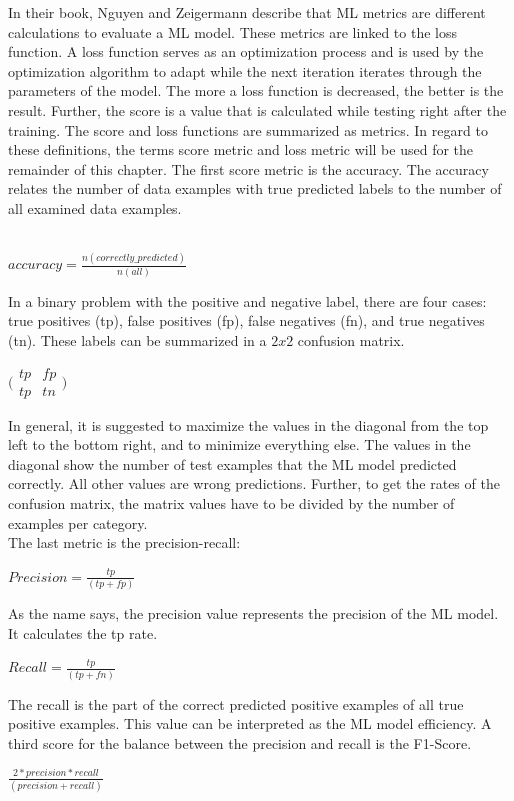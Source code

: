 In their book, Nguyen and Zeigermann \cite{9783960101925} describe that ML metrics are different calculations to evaluate a ML model. These metrics are linked to the loss function. A loss function serves as an optimization process and is used by the optimization algorithm to adapt while the next iteration iterates through the parameters of the model. The more a loss function is decreased, the better is the result. Further, the score is a value that is calculated while testing right after the training. The score and loss functions are summarized as metrics. In regard to these definitions, the terms score metric and loss metric will be used for the remainder of this chapter. The first score metric is the accuracy. The accuracy relates the number of data examples with true predicted labels to the number of all examined data examples. \\ \\
\begin{center}
  $accuracy=\frac{n(correctly\_predicted)}{n(all)}$
\end{center}
In a binary problem with the positive and negative label, there are four cases: true positives (tp), false positives (fp), false negatives (fn), and true negatives (tn). These labels can be summarized in a $2 x 2$ confusion matrix. \\
\begin{center}
  $\bigl( \begin{matrix}tp & fp\\ tp & tn\end{matrix}\bigr)$
\end{center}
In general, it is suggested to maximize the values in the diagonal from the top left to the bottom right, and to minimize everything else. The values in the diagonal show the number of test examples that the ML model predicted correctly. All other values are wrong predictions. Further, to get the rates of the confusion matrix, the matrix values have to be divided by the number of examples per category. \\ The last metric is the precision-recall:
\begin{center}
  $Precision = \frac{tp}{(tp + fp)}$
\end{center}
As the name says, the precision value represents the precision of the ML model. It calculates the tp rate.
\begin{center}
  $Recall = \frac{tp}{(tp + fn)}$
\end{center}
The recall is the part of the correct predicted positive examples of all true positive examples. This value can be interpreted as the ML model efficiency.
A third score for the balance between the precision and recall is the F1-Score.
\begin{center}
  $\frac{2 * precision * recall}{(precision + recall)}$
\end{center}

